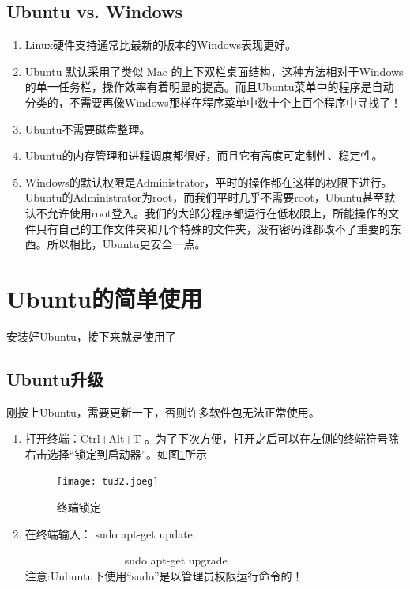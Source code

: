 \documentclass{article}
\begin{document}
\subsection{Ubuntu vs. Windows}
\begin{enumerate}
\item Linux硬件支持通常比最新的版本的Windows表现更好。

\item Ubuntu 默认采用了类似 Mac 的上下双栏桌面结构，这种方法相对于Windows的单一任务栏，操作效率有着明显的提高。而且Ubuntu菜单中的程序是自动分类的，不需要再像Windows那样在程序菜单中数十个上百个程序中寻找了！

\item Ubuntu不需要磁盘整理。

\item Ubuntu的内存管理和进程调度都很好，而且它有高度可定制性、稳定性。

\item Windows的默认权限是Administrator，平时的操作都在这样的权限下进行。Ubuntu的Administrator为root，而我们平时几乎不需要root，Ubuntu甚至默认不允许使用root登入。我们的大部分程序都运行在低权限上，所能操作的文件只有自己的工作文件夹和几个特殊的文件夹，没有密码谁都改不了重要的东西。所以相比，Ubuntu更安全一点。
\end{enumerate}
\section{Ubuntu的简单使用}
 安装好Ubuntu，接下来就是使用了
\subsection{Ubuntu升级}
  刚按上Ubuntu，需要更新一下，否则许多软件包无法正常使用。
\begin{enumerate}
\item 打开终端：Ctrl+Alt+T 。为了下次方便，打开之后可以在左侧的终端符号除右击选择“锁定到启动器”。如图\ref{tu32}所示

\begin{figure}[!htb] %
\centering
\texttt{[image: tu32.jpeg]}
\caption{\small 终端锁定}
\label{tu32}
\end{figure} 

 \item 在终端输入： sudo apt-get update

~~~~~~~~~~~~~~~~~~sudo apt-get upgrade\\
{\color{red}注意:}Uubuntu下使用{\color{red}“sudo”}是以管理员权限运行命令的！
\end{enumerate}
\end{document}
